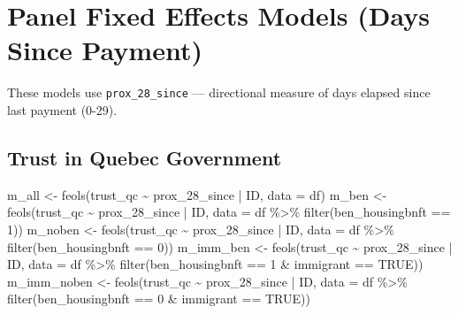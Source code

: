 \documentclass[
  letterpaper,
  DIV=11,
  numbers=noendperiod]{scrartcl}
\newenvironment{Shaded}{\begin{snugshade}}{\end{snugshade}}
\newcommand{\AttributeTok}[1]{\textcolor[rgb]{0.40,0.45,0.13}{#1}}
\newcommand{\ConstantTok}[1]{\textcolor[rgb]{0.56,0.35,0.01}{#1}}
\newcommand{\DecValTok}[1]{\textcolor[rgb]{0.68,0.00,0.00}{#1}}
\newcommand{\FunctionTok}[1]{\textcolor[rgb]{0.28,0.35,0.67}{#1}}
\newcommand{\NormalTok}[1]{\textcolor[rgb]{0.00,0.23,0.31}{#1}}
\newcommand{\OtherTok}[1]{\textcolor[rgb]{0.00,0.23,0.31}{#1}}
\newcommand{\SpecialCharTok}[1]{\textcolor[rgb]{0.37,0.37,0.37}{#1}}
\begin{document}
\hypertarget{panel-fixed-effects-models-days-since-payment}{%
\section{Panel Fixed Effects Models (Days Since
Payment)}\label{panel-fixed-effects-models-days-since-payment}}

These models use \texttt{prox\_28\_since} --- directional measure of
days elapsed since last payment (0-29).

\hypertarget{trust-in-quebec-government-1}{%
\subsection{Trust in Quebec
Government}\label{trust-in-quebec-government-1}}

\begin{Shaded}
\begin{Highlighting}[]
\NormalTok{m\_all }\OtherTok{\textless{}{-}} \FunctionTok{feols}\NormalTok{(trust\_qc }\SpecialCharTok{\textasciitilde{}}\NormalTok{ prox\_28\_since }\SpecialCharTok{|}\NormalTok{ ID, }\AttributeTok{data =}\NormalTok{ df)}
\NormalTok{m\_ben }\OtherTok{\textless{}{-}} \FunctionTok{feols}\NormalTok{(trust\_qc }\SpecialCharTok{\textasciitilde{}}\NormalTok{ prox\_28\_since }\SpecialCharTok{|}\NormalTok{ ID,}
               \AttributeTok{data =}\NormalTok{ df }\SpecialCharTok{\%\textgreater{}\%} \FunctionTok{filter}\NormalTok{(ben\_housingbnft }\SpecialCharTok{==} \DecValTok{1}\NormalTok{))}
\NormalTok{m\_noben }\OtherTok{\textless{}{-}} \FunctionTok{feols}\NormalTok{(trust\_qc }\SpecialCharTok{\textasciitilde{}}\NormalTok{ prox\_28\_since }\SpecialCharTok{|}\NormalTok{ ID,}
                 \AttributeTok{data =}\NormalTok{ df }\SpecialCharTok{\%\textgreater{}\%} \FunctionTok{filter}\NormalTok{(ben\_housingbnft }\SpecialCharTok{==} \DecValTok{0}\NormalTok{))}
\NormalTok{m\_imm\_ben }\OtherTok{\textless{}{-}} \FunctionTok{feols}\NormalTok{(trust\_qc }\SpecialCharTok{\textasciitilde{}}\NormalTok{ prox\_28\_since }\SpecialCharTok{|}\NormalTok{ ID,}
                   \AttributeTok{data =}\NormalTok{ df }\SpecialCharTok{\%\textgreater{}\%} \FunctionTok{filter}\NormalTok{(ben\_housingbnft }\SpecialCharTok{==} \DecValTok{1} \SpecialCharTok{\&}\NormalTok{ immigrant }\SpecialCharTok{==} \ConstantTok{TRUE}\NormalTok{))}
\NormalTok{m\_imm\_noben }\OtherTok{\textless{}{-}} \FunctionTok{feols}\NormalTok{(trust\_qc }\SpecialCharTok{\textasciitilde{}}\NormalTok{ prox\_28\_since }\SpecialCharTok{|}\NormalTok{ ID,}
                     \AttributeTok{data =}\NormalTok{ df }\SpecialCharTok{\%\textgreater{}\%} \FunctionTok{filter}\NormalTok{(ben\_housingbnft }\SpecialCharTok{==} \DecValTok{0} \SpecialCharTok{\&}\NormalTok{ immigrant }\SpecialCharTok{==} \ConstantTok{TRUE}\NormalTok{))}

\end{Highlighting}
\end{Shaded}
\end{document}
